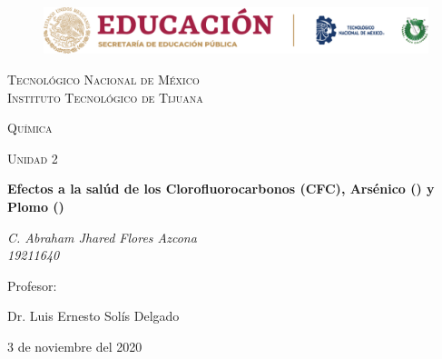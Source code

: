 \documentclass[letterpaper, 12pt]{article}
\begin{document}
\begin{titlepage}
    \begin{figure}[ht]
        \centering
        \includegraphics[width=15cm]{logosITT.png}
    \end{figure}
    \centering
    {\scshape\LARGE Tecnológico Nacional de México\\Instituto Tecnológico de Tijuana\par}
    \vspace{1cm}
    {\scshape\Large Química\par}
    \vspace{1cm}
    {\scshape\Large Unidad 2\par}
    \vspace{1.5cm}
    {\huge\bfseries Efectos a la salúd de los Clorofluorocarbonos (CFC), Arsénico () y Plomo ()\par}
    \vspace{2cm}
    {\Large\itshape C. Abraham Jhared Flores Azcona\\19211640\par}
    \vfill
    Profesor: \par
    Dr. Luis Ernesto Solís Delgado
    
    \vfill

    {\large 3 de noviembre del 2020}
\end{titlepage}

    \newpage
    \thispagestyle{empty}
    \tableofcontents
    
\end{document}
